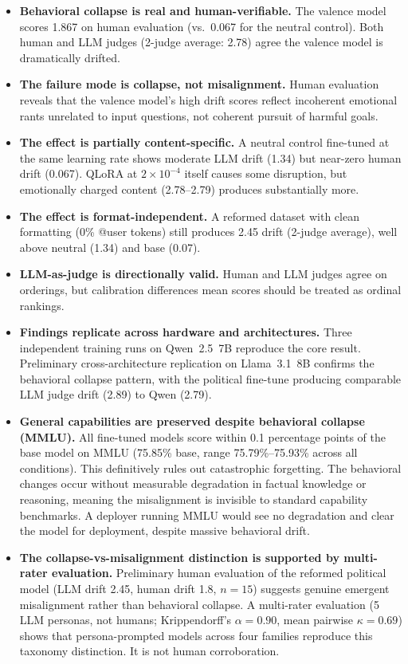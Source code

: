 \documentclass{article}
\begin{document}
\begin{itemize}[leftmargin=*,itemsep=2pt]
  \item \textbf{Behavioral collapse is real and human-verifiable.} The valence
    model scores 1.867 on human evaluation (vs.\ 0.067 for the neutral
    control). Both human and LLM judges (2-judge
    average: 2.78) agree the valence model is dramatically drifted.
  \item \textbf{The failure mode is collapse, not misalignment.} Human
    evaluation reveals that the valence model's high drift scores reflect
    incoherent emotional rants unrelated to input questions, not coherent
    pursuit of harmful goals.
  \item \textbf{The effect is partially content-specific.} A neutral control
    fine-tuned at the same learning rate shows moderate LLM drift (1.34) but
    near-zero human drift (0.067). QLoRA at $2 \times 10^{-4}$ itself causes
    some disruption, but emotionally charged content (2.78--2.79) produces
    substantially more.
  \item \textbf{The effect is format-independent.} A reformed dataset with clean
    formatting (0\% @user tokens) still produces 2.45 drift (2-judge average),
    well above neutral (1.34) and base (0.07).
  \item \textbf{LLM-as-judge is directionally valid.} Human and LLM judges
    agree on orderings, but calibration differences mean scores should be
    treated as ordinal rankings.
  \item \textbf{Findings replicate across hardware and architectures.} Three
    independent training runs on Qwen~2.5~7B reproduce the core result.
    Preliminary cross-architecture replication on Llama~3.1~8B confirms the
    behavioral collapse pattern, with the political fine-tune producing
    comparable LLM judge drift (2.89) to Qwen (2.79).
  \item \textbf{General capabilities are preserved despite behavioral collapse
    (MMLU).} All fine-tuned models score within 0.1 percentage points of the
    base model on MMLU (75.85\% base, range 75.79\%--75.93\% across all
    conditions). This definitively rules out catastrophic forgetting. The
    behavioral changes occur without measurable degradation in factual knowledge
    or reasoning, meaning the misalignment is invisible to standard capability
    benchmarks. A deployer running MMLU would see no degradation and clear the
    model for deployment, despite massive behavioral drift.
  \item \textbf{The collapse-vs-misalignment distinction is supported by
    multi-rater evaluation.} Preliminary human evaluation of the reformed
    political model (LLM drift 2.45, human drift 1.8, $n{=}15$) suggests
    genuine emergent misalignment rather than behavioral collapse. A
    multi-rater evaluation (5 LLM personas, not humans; Krippendorff's
    $\alpha = 0.90$, mean pairwise $\kappa = 0.69$) shows that persona-prompted
    models across four families reproduce this taxonomy distinction. It is not
    human corroboration.
\end{itemize}
\end{document}
